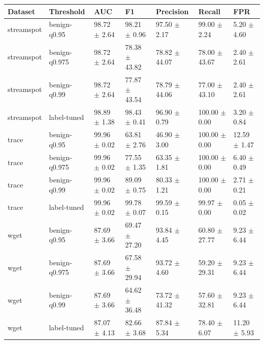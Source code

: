 \begin{tabular}{lllllll}
\toprule
Dataset & Threshold & AUC & F1 & Precision & Recall & FPR \\
\midrule
streamspot & benign-q0.95 & 98.72 $\pm$ 2.64 & 98.21 $\pm$ 0.96 & 97.50 $\pm$ 2.17 & 99.00 $\pm$ 2.24 & 5.20 $\pm$ 4.60 \\
streamspot & benign-q0.975 & 98.72 $\pm$ 2.64 & 78.38 $\pm$ 43.82 & 78.82 $\pm$ 44.07 & 78.00 $\pm$ 43.67 & 2.40 $\pm$ 2.61 \\
streamspot & benign-q0.99 & 98.72 $\pm$ 2.64 & 77.87 $\pm$ 43.54 & 78.79 $\pm$ 44.06 & 77.00 $\pm$ 43.10 & 2.40 $\pm$ 2.61 \\
streamspot & label-tuned & 98.89 $\pm$ 1.38 & 98.43 $\pm$ 0.41 & 96.90 $\pm$ 0.79 & 100.00 $\pm$ 0.00 & 3.20 $\pm$ 0.84 \\
trace & benign-q0.95 & 99.96 $\pm$ 0.02 & 63.81 $\pm$ 2.76 & 46.90 $\pm$ 3.00 & 100.00 $\pm$ 0.00 & 12.59 $\pm$ 1.47 \\
trace & benign-q0.975 & 99.96 $\pm$ 0.02 & 77.55 $\pm$ 1.35 & 63.35 $\pm$ 1.81 & 100.00 $\pm$ 0.00 & 6.40 $\pm$ 0.49 \\
trace & benign-q0.99 & 99.96 $\pm$ 0.02 & 89.09 $\pm$ 0.75 & 80.33 $\pm$ 1.21 & 100.00 $\pm$ 0.00 & 2.71 $\pm$ 0.21 \\
trace & label-tuned & 99.96 $\pm$ 0.02 & 99.78 $\pm$ 0.07 & 99.59 $\pm$ 0.15 & 99.97 $\pm$ 0.00 & 0.05 $\pm$ 0.02 \\
wget & benign-q0.95 & 87.69 $\pm$ 3.66 & 69.47 $\pm$ 27.20 & 93.84 $\pm$ 4.45 & 60.80 $\pm$ 27.77 & 9.23 $\pm$ 6.44 \\
wget & benign-q0.975 & 87.69 $\pm$ 3.66 & 67.58 $\pm$ 29.94 & 93.72 $\pm$ 4.60 & 59.20 $\pm$ 29.31 & 9.23 $\pm$ 6.44 \\
wget & benign-q0.99 & 87.69 $\pm$ 3.66 & 64.62 $\pm$ 36.48 & 73.72 $\pm$ 41.32 & 57.60 $\pm$ 32.81 & 9.23 $\pm$ 6.44 \\
wget & label-tuned & 87.07 $\pm$ 4.13 & 82.66 $\pm$ 3.68 & 87.84 $\pm$ 5.34 & 78.40 $\pm$ 6.07 & 11.20 $\pm$ 5.93 \\
\bottomrule
\end{tabular}
